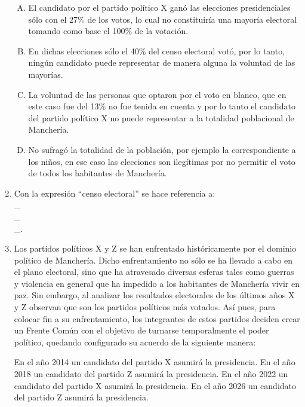 \begin{enumerate}
\begin{enumerate}[(A)]
\item El candidato por el partido político X ganó las elecciones presidenciales sólo con el 27\% de los votos, lo cual no constituiría una mayoría electoral tomando como base el 100\% de la votación.
\item En dichas elecciones sólo el 40\% del censo electoral votó, por lo tanto, ningún candidato puede representar de manera alguna la voluntad de las mayorías.   
\item La voluntad de las personas que optaron por el voto en blanco, que en este caso fue del 13\% no fue tenida en cuenta y por lo tanto el candidato del partido político X no puede representar a la totalidad poblacional de Manchería.
\item No sufragó la totalidad de la población, por ejemplo la correspondiente a los niños, en ese caso las elecciones son ilegítimas por no permitir el voto de todos los habitantes de Manchería.

\end{enumerate}

\item Con la expresión ``censo electoral'' se hace referencia a:\label{socandres-23}\hrulefill\\
\_\hrulefill\\
\_\hrulefill\\
\_\hrulefill.

\newpage

\item Los partidos políticos X y Z se han enfrentado históricamente por el dominio político de Manchería. Dicho enfrentamiento no sólo se ha llevado a cabo en el plano electoral, sino que ha atravesado diversas esferas tales como guerras y violencia en general que ha impedido a los habitantes de Manchería vivir en paz. Sin embargo, al analizar los resultados electorales de los últimos años X y Z observan que son los partidos políticos más votados. Así pues, para colocar fin a su enfrentamiento, los integrantes de estos partidos deciden crear un Frente Común con el objetivo de turnarse temporalmente el poder político, quedando configurado su acuerdo de la siguiente manera:\label{socandres-24}

En el año 2014 un candidato del partido X asumirá la presidencia.
En el año 2018 un candidato del partido Z asumirá la presidencia.
En el año 2022 un candidato del partido X asumirá la presidencia.
En el año 2026 un candidato del partido Z asumirá la presidencia.


\end{enumerate}
